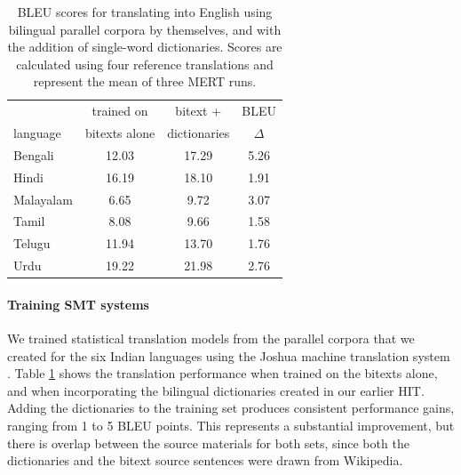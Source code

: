 \documentclass[11pt]{article}
\begin{document}
\begin{table}[t]
\centering
  \small
\begin{tabular}{l|cc|c}
  		  & trained on  &  bitext + & BLEU \\
  language  & bitexts alone &  dictionaries & $\Delta$ \\
  \hline\hline
  Bengali    &  12.03 & 17.29 & 5.26 \\
  Hindi      & 16.19 & 18.10 & 1.91 \\  
  Malayalam    &  6.65 & 9.72 & 3.07 \\      
  Tamil      & 8.08 & 9.66 & 1.58 \\  
  Telugu     & 11.94 & 13.70 & 1.76 \\  
  Urdu        & 19.22 & 21.98 & 2.76 \\   
\end{tabular}
\caption{BLEU scores for translating into English using bilingual parallel corpora by themselves, and with the addition of single-word dictionaries. Scores are calculated using four reference translations and represent the mean of three MERT runs.}
\label{dictionary_bleu}
\end{table}


\paragraph{Training SMT systems}
We trained statistical translation models from the parallel corpora that we created for the six Indian languages using the Joshua machine translation system \cite{post-EtAl:2013:WMT}. Table \ref{dictionary_bleu} shows the translation performance when trained on the bitexts alone, and when incorporating the bilingual dictionaries created in our earlier HIT. Adding the dictionaries to the training set produces consistent performance gains, ranging from 1 to 5 BLEU points.  This represents a substantial improvement, but there is overlap between the source materials for both sets, since both the dictionaries and the bitext source sentences were drawn from Wikipedia.

\end{document}
